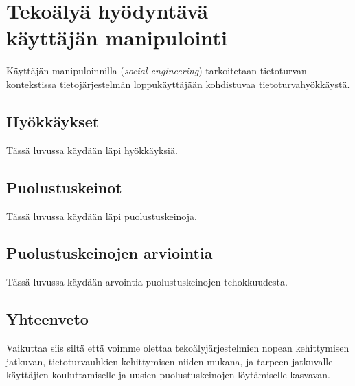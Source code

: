 


\chapter*{Tekoälyä hyödyntävä\\käyttäjän manipulointi\label{chapter:finnish}}
\begin{comment}

Ohjeet:
    - 4 or 5 sivua

\end{comment}


Käyttäjän manipuloinnilla (\textit{social engineering}) tarkoitetaan tietoturvan kontekstissa tietojärjestelmän loppukäyttäjään kohdistuvaa tietoturvahyökkäystä.

\section*{Hyökkäykset}

Tässä luvussa käydään läpi hyökkäyksiä.

\section*{Puolustuskeinot}

Tässä luvussa käydään läpi puolustuskeinoja.

\section*{Puolustuskeinojen arviointia}

Tässä luvussa käydään arvointia puolustuskeinojen tehokkuudesta.

\section*{Yhteenveto}

Vaikuttaa siis siltä että voimme olettaa tekoälyjärjestelmien nopean kehittymisen jatkuvan, tietoturvauhkien kehittymisen niiden mukana, ja tarpeen jatkuvalle käyttäjien kouluttamiselle ja uusien puolustuskeinojen löytämiselle kasvavan.